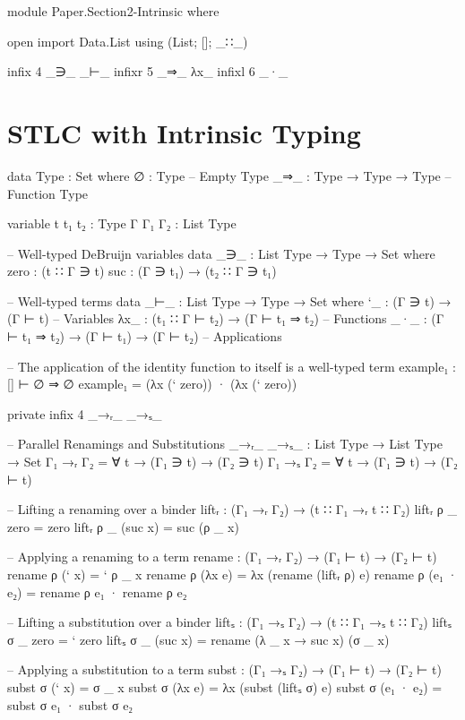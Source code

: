 \begin{code}[hide]
module Paper.Section2-Intrinsic where

open import Data.List using (List; []; _∷_)

infix  4  _∋_  _⊢_
infixr 5  _⇒_  λx_
infixl 6  _·_
\end{code}

\newpage
\section{STLC with Intrinsic Typing}

\begin{code}
data Type : Set where
  ∅    : Type                -- Empty Type
  _⇒_  : Type → Type → Type  -- Function Type

variable
  t t₁ t₂  : Type
  Γ Γ₁ Γ₂  : List Type

-- Well-typed DeBruijn variables
data _∋_ : List Type → Type → Set where
  zero  : (t ∷ Γ ∋ t)
  suc   : (Γ ∋ t₁) → (t₂ ∷ Γ ∋ t₁)

-- Well-typed terms
data _⊢_ : List Type → Type → Set where
  `_   : (Γ ∋ t) → (Γ ⊢ t)                    -- Variables
  λx_  : (t₁ ∷ Γ ⊢ t₂) → (Γ ⊢ t₁ ⇒ t₂)        -- Functions
  _·_  : (Γ ⊢ t₁ ⇒ t₂) → (Γ ⊢ t₁) → (Γ ⊢ t₂)  -- Applications
\end{code}

\begin{code}[hide]
-- The application of the identity function to itself is a well-typed term
example₁ : [] ⊢ ∅ ⇒ ∅
example₁ = (λx (` zero)) · (λx (` zero))
\end{code}

\begin{code}[hide]
private
  infix  4  _→ᵣ_  _→ₛ_
\end{code}

\begin{code}
  -- Parallel Renamings and Substitutions
  _→ᵣ_ _→ₛ_ : List Type → List Type → Set
  Γ₁ →ᵣ Γ₂ = ∀ t → (Γ₁ ∋ t) → (Γ₂ ∋ t)
  Γ₁ →ₛ Γ₂ = ∀ t → (Γ₁ ∋ t) → (Γ₂ ⊢ t)

  -- Lifting a renaming over a binder
  liftᵣ : (Γ₁ →ᵣ Γ₂) → (t ∷ Γ₁ →ᵣ t ∷ Γ₂)
  liftᵣ ρ _ zero     = zero
  liftᵣ ρ _ (suc x)  = suc (ρ _ x)

  -- Applying a renaming to a term
  rename : (Γ₁ →ᵣ Γ₂) → (Γ₁ ⊢ t) → (Γ₂ ⊢ t)
  rename ρ (` x)      = ` ρ _ x
  rename ρ (λx e)     = λx (rename (liftᵣ ρ) e)
  rename ρ (e₁ · e₂)  = rename ρ e₁ · rename ρ e₂

  -- Lifting a substitution over a binder
  liftₛ : (Γ₁ →ₛ Γ₂) → (t ∷ Γ₁ →ₛ t ∷ Γ₂)
  liftₛ σ _ zero     = ` zero
  liftₛ σ _ (suc x)  = rename (λ _ x → suc x) (σ _ x)

  -- Applying a substitution to a term
  subst : (Γ₁ →ₛ Γ₂) → (Γ₁ ⊢ t) → (Γ₂ ⊢ t)
  subst σ (` x)      = σ _ x
  subst σ (λx e)     = λx (subst (liftₛ σ) e)
  subst σ (e₁ · e₂)  = subst σ e₁ · subst σ e₂
\end{code}
